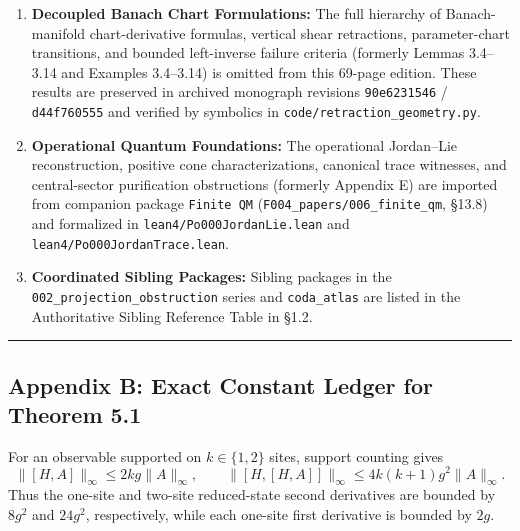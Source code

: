 \documentclass[
  11pt,
]{article}
\providecommand{\tightlist}{%
  \setlength{\itemsep}{0pt}\setlength{\parskip}{0pt}}
\providecommand{\tightlist}{%
  \setlength{\itemsep}{0pt}\setlength{\parskip}{0pt}}
\begin{document}
\begin{enumerate}
\def\labelenumi{\arabic{enumi}.}
\tightlist
\item
  \textbf{Decoupled Banach Chart Formulations:} The full hierarchy of Banach-manifold chart-derivative formulas, vertical shear retractions, parameter-chart transitions, and bounded left-inverse failure criteria (formerly Lemmas 3.4--3.14 and Examples 3.4--3.14) is omitted from this 69-page edition. These results are preserved in archived monograph revisions \texttt{90e6231546} / \texttt{d44f760555} and verified by symbolics in \texttt{code/retraction\_geometry.py}.
\item
  \textbf{Operational Quantum Foundations:} The operational Jordan--Lie reconstruction, positive cone characterizations, canonical trace witnesses, and central-sector purification obstructions (formerly Appendix E) are imported from companion package \texttt{Finite\ QM} (\texttt{F004\_papers/006\_finite\_qm}, §13.8) and formalized in \texttt{lean4/Po000JordanLie.lean} and \texttt{lean4/Po000JordanTrace.lean}.
\item
  \textbf{Coordinated Sibling Packages:} Sibling packages in the \texttt{002\_projection\_obstruction} series and \texttt{coda\_atlas} are listed in the Authoritative Sibling Reference Table in §1.2.
\end{enumerate}

\begin{center}\rule{0.5\linewidth}{0.5pt}\end{center}

\subsection{Appendix B: Exact Constant Ledger for Theorem 5.1}\label{appendix-b-exact-constant-ledger-for-theorem-5.1}

For an observable supported on \(k\in\{1,2\}\) sites, support counting gives
\[
\lVert[H,A]\rVert_\infty\le2kg\lVert A\rVert_\infty,
\qquad
\lVert[H,[H,A]]\rVert_\infty
\le4k(k+1)g^2\lVert A\rVert_\infty.
\]
Thus the one-site and two-site reduced-state second derivatives are bounded by \(8g^2\) and \(24g^2\), respectively, while each one-site first derivative is bounded by \(2g\).
\end{document}
